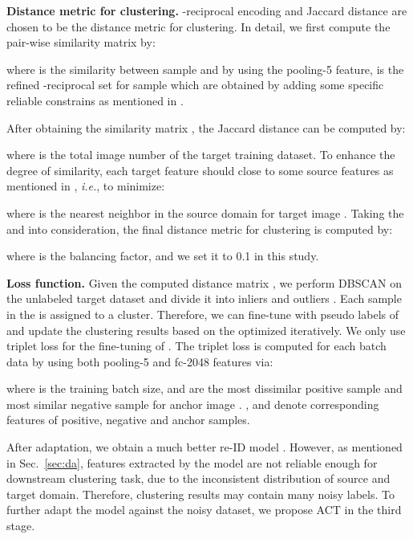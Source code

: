\documentclass[letterpaper]{article} \usepackage{aaai20}  \usepackage{times}  \usepackage{helvet} \usepackage{courier}  \usepackage[hyphens]{url}  \usepackage{graphicx} \urlstyle{rm} \def\UrlFont{\rm}  \usepackage{graphicx}  \frenchspacing  \setlength{\pdfpagewidth}{8.5in}  \setlength{\pdfpageheight}{11in}  \usepackage{color}
\begin{document}
\textbf{Distance metric for clustering.}
   -reciprocal encoding and Jaccard distance are chosen to be the distance metric for clustering. In detail, we first compute the pair-wise similarity matrix  by:
     
    where  is the similarity between sample  and  by using the pooling-5 feature,   is the refined -reciprocal set for sample  which are obtained by adding some specific reliable constrains as mentioned in \cite{zhong2017re}. 

    After obtaining the similarity matrix , the Jaccard distance  can be computed by: 
    
    where  is the total image number of the target training dataset. To enhance the degree of similarity, each target feature should close to some source features as mentioned in \cite{panareda2017open}, \textit{i.e.}, to minimize:
    
    where  is the nearest neighbor in the source domain for target image . Taking the  and  into consideration, the final distance metric for clustering is computed by:
    
    where  is the balancing factor, and we set it to 0.1 in this study. 
    
    
    \textbf{Loss function.}	
    Given the computed distance matrix , we perform DBSCAN on the unlabeled target dataset  and divide it into inliers  and outliers . Each sample in the  is assigned to a cluster. Therefore, we can fine-tune  with pseudo labels of  and update the clustering results based on the optimized  iteratively. We only use triplet loss for the fine-tuning of . The triplet loss is computed for each batch data by using both pooling-5 and fc-2048 features via:
	
	where  is the training batch size,  and  are the most dissimilar positive sample and most similar negative sample for anchor image . ,  and  denote corresponding features of positive, negative and anchor samples.


After adaptation, we obtain a much better re-ID model . However, as mentioned in Sec.~\ref{sec:da}, features extracted by the model are not reliable enough for downstream clustering task, due to the inconsistent distribution of source and target domain. Therefore, clustering results may contain many noisy labels. To further adapt the model against the noisy dataset, we propose ACT in the third stage.
\end{document}

